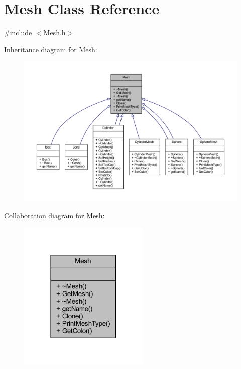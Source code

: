 \hypertarget{class_mesh}{}\section{Mesh Class Reference}
\label{class_mesh}


{\ttfamily \#include $<$Mesh.\+h$>$}



Inheritance diagram for Mesh\+:
\nopagebreak
\begin{figure}[H]
\begin{center}
\leavevmode
\includegraphics[width=350pt]{class_mesh__inherit__graph}
\end{center}
\end{figure}


Collaboration diagram for Mesh\+:
\nopagebreak
\begin{figure}[H]
\begin{center}
\leavevmode
\includegraphics[width=177pt]{class_mesh__coll__graph}
\end{center}
\end{figure}
